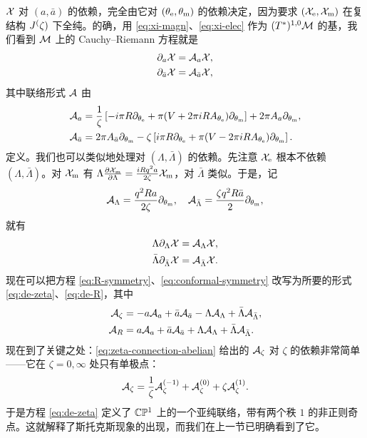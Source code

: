 $\mathcal{X}$ 对 $(a, \bar{a})$ 的依赖，完全由它对 $(\theta_{\mathrm{e}}, \theta_{\mathrm{m}})$ 的依赖决定，因为要求 $(\mathcal{X}_{\mathrm{e}}, \mathcal{X}_{\mathrm{m}})$ 在复结构 $J^(\zeta)$ 下全纯。的确，用 \eqref{eq:xi-magn}、\eqref{eq:xi-elec} 作为 $(T^*)^{1,0} \mathcal{M}$ 的基，我们看到 $\mathcal{M}$ 上的 Cauchy–Riemann 方程就是
\begin{align}
\partial_a \mathcal{X} &= \mathcal{A}_a \mathcal{X}, \label{eq:de-cr-1} \\
\partial_{\bar a} \mathcal{X} &= \mathcal{A}_{\bar a} \mathcal{X}, \label{eq:de-cr-2}
\end{align}
其中联络形式 $\mathcal{A}$ 由
\begin{align}
\mathcal{A}_a &= \frac{1}{\zeta} \left[ - i \pi R \partial_{\theta_{\mathrm{e}}} + \pi (V + 2 \pi i R A_{\theta_{\mathrm{e}}}) \partial_{\theta_{\mathrm{m}}} \right] + 2 \pi A_a \partial_{\theta_{\mathrm{m}}}, \\
\mathcal{A}_{\bar a} &= 2 \pi A_{\bar a} \partial_{\theta_{\mathrm{m}}} - \zeta \left[ i \pi R \partial_{\theta_{\mathrm{e}}} + \pi (V - 2 \pi i R A_{\theta_{\mathrm{e}}}) \partial_{\theta_{\mathrm{m}}} \right].
\end{align}
定义。我们也可以类似地处理对 $(\Lambda, \bar\Lambda)$ 的依赖。先注意 $\mathcal{X}_{\mathrm{e}}$ 根本不依赖 $(\Lambda, \bar\Lambda)$。对 $\mathcal{X}_{\mathrm{m}}$ 有 $\Lambda \frac{\partial \mathcal{X}_{\mathrm{m}}}{\partial \Lambda} = \frac{i R q^2 a}{2 \zeta} \mathcal{X}_{\mathrm{m}}$，对 $\bar\Lambda$ 类似。于是，记
\begin{equation}
\mathcal{A}_\Lambda = \frac{q^2 R a}{2 \zeta} \partial_{\theta_{\mathrm{m}}}, \quad \mathcal{A}_{\bar\Lambda} = \frac{ \zeta q^2 R \bar{a}}{2} \partial_{\theta_{\mathrm{m}}},
\end{equation}
就有
\begin{align}
\Lambda \partial_\Lambda \mathcal{X} &= \mathcal{A}_\Lambda \mathcal{X}, \\
\bar\Lambda \partial_{\bar\Lambda} \mathcal{X} &= \mathcal{A}_{\bar\Lambda} \mathcal{X}.
\end{align}
现在可以把方程 \eqref{eq:R-symmetry}、\eqref{eq:conformal-symmetry} 改写为所要的形式 \eqref{eq:de-zeta}、\eqref{eq:de-R}，其中
\begin{align}
\mathcal{A}_\zeta &= -a \mathcal{A}_a + \bar{a} \mathcal{A}_{\bar a} - \Lambda \mathcal{A}_{\Lambda} + \bar\Lambda \mathcal{A}_{\bar\Lambda}, \label{eq:zeta-connection-abelian} \\
\mathcal{A}_R &= a \mathcal{A}_a + \bar{a} \mathcal{A}_{\bar a} + \Lambda \mathcal{A}_{\Lambda} + \bar\Lambda \mathcal{A}_{\bar\Lambda}.
\end{align}
现在到了关键之处：\eqref{eq:zeta-connection-abelian} 给出的 $\mathcal{A}_\zeta$ 对 $\zeta$ 的依赖非常简单——它在 $\zeta = 0, \infty$ 处只有单极点：
\begin{equation}
\mathcal{A}_\zeta = \frac{1}{\zeta} \mathcal{A}^{(-1)}_\zeta + \mathcal{A}^{(0)}_\zeta + \zeta \mathcal{A}^{(1)}_\zeta.
\end{equation}
于是方程 \eqref{eq:de-zeta} 定义了 $\mathbb{C}\mathbb{P}^1$ 上的一个亚纯联络，带有两个秩 $1$ 的非正则奇点。这就解释了斯托克斯现象的出现，而我们在上一节已明确看到了它。

